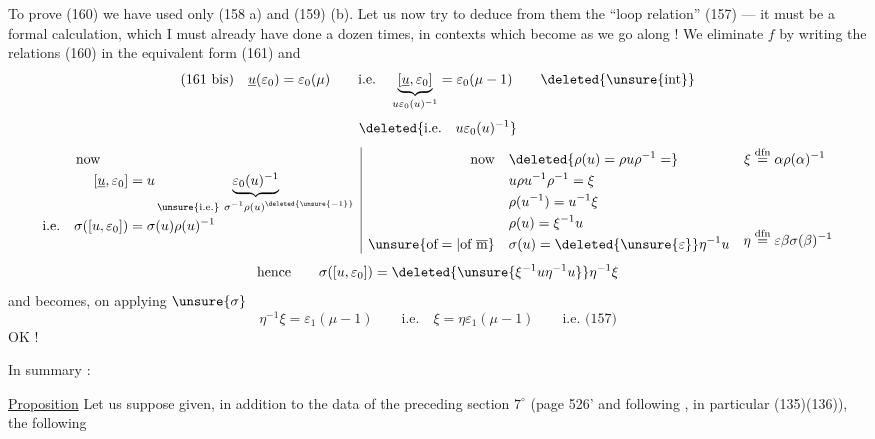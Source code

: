 To prove (160) we have used only (158 a) and (159) (b). Let us now try to deduce from them the ``loop relation'' (157) --- it must be a formal calculation, which I must already have done a dozen times, in contexts which become  as we go along ! We eliminate $f$ by writing the relations (160) in the equivalent form (161) and
\[
(161\ \text{bis})\quad
\underline u(\varepsilon_0)=\varepsilon_0(\mu)
\qquad\text{i.e.}\quad
\underbrace{[\underline u,\varepsilon_0]}_{u\varepsilon_0(u)^{-1}}
=\varepsilon_0(\mu-1)\qquad\deleted{\unsure{\operatorname{int}}}
\]
\[
\deleted{\text{i.e.}\quad u\varepsilon_0(u)^{-1}}
\]
\[
\begin{array}{l|ll}
\begin{aligned}[t]
\text{now}\qquad&\\
[\underline u,\varepsilon_0]&=
u\underbrace{\varepsilon_0(u)^{-1}}_{\substack{\unsure{\text{i.e.}}\ \sigma^{-1}\rho(u)^{\deleted{\unsure{-1}}}}}\\
\text{i.e.}\quad\sigma([u,\varepsilon_0])&=\sigma(u)\rho(u)^{-1}
\end{aligned}
&
\begin{aligned}[t]
\text{now}\quad&\deleted{\rho(u)=\rho u\rho^{-1}=}\\
&u\rho u^{-1}\rho^{-1}=\xi\\
&\rho(u^{-1})=u^{-1}\xi\\
&\rho(u)=\xi^{-1}u\\
\unsure{\text{of}=|\text{of }\overline{\mathrm m}}\quad&\sigma(u)=\deleted{\unsure{\varepsilon}}\eta^{-1}u
\end{aligned}
&
\begin{aligned}[t]
\xi&\overset{\mathrm{dfn}}{=}\alpha\rho(\alpha)^{-1}\\[4em]
\eta&\overset{\mathrm{dfn}}{=}\varepsilon\beta\sigma(\beta)^{-1}
\end{aligned}
\end{array}
\]
\[
\text{hence}\qquad
\sigma([u,\varepsilon_0])=
\deleted{\unsure{\xi^{-1}u\eta^{-1}u}}\eta^{-1}\xi
\]
and \unsure{(*)|($\alpha$)} becomes, on applying $\unsure{\sigma}$
\[
\eta^{-1}\xi=\varepsilon_1(\mu-1)
\qquad\text{i.e.}\quad\xi=\eta\varepsilon_1(\mu-1)
\qquad\text{i.e. (157)}
\]
\hfill OK !


In summary :

\uline{Proposition} Let us suppose given, in addition to the data of the preceding section $7^\circ$ (page 526' and following \unsure{\}|)}, in particular (135)(136)),  the following

